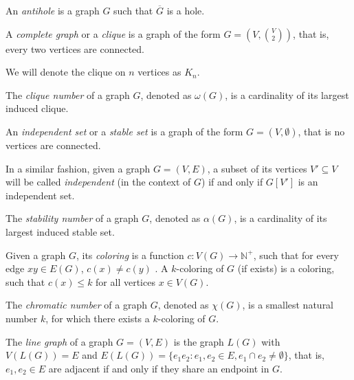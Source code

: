 \begin{defn}[antihole]
  An \emph{antihole} is a graph $G$ such that $\overline{G}$ is a hole.
\end{defn}

\begin{defn}[clique]
  A \emph{complete graph} or a \emph{clique} is a graph of the form $G = (V, {V \choose 2})$, that is, every two vertices are connected.
\end{defn}

We will denote the clique on $n$ vertices as $K_n$.

\begin{defn}
  The \emph{clique number} of a graph $G$, denoted as $\omega(G)$, is a cardinality of its largest induced clique.
\end{defn}

\begin{defn}
  An \emph{independent set} or a \emph{stable set} is a graph of the form $G = (V, \emptyset)$, that is no vertices are connected.
\end{defn}
In a similar fashion, given a graph $G = (V, E)$, a subset of its vertices $V' \subseteq V$ will be called \emph{independent} (in the context of $G$) if and only if $G[V']$ is an independent set.

\begin{defn}
  The \emph{stability number} of a graph $G$, denoted as $\alpha(G)$, is a cardinality of its largest induced stable set.
\end{defn}

\begin{defn}[coloring]
  Given a graph $G$, its \emph{coloring} is a function $c: V(G) \rightarrow \mathbb{N}^+$, such that for every edge $xy \in E(G)$, $c(x) \neq c(y)$ . A $k$-coloring of $G$ (if exists) is a coloring, such that $c(x) \leq k$ for all vertices $x \in V(G)$.
\end{defn}

\begin{defn}
  The \emph{chromatic number} of a graph $G$, denoted as $\chi(G)$, is a smallest natural number $k$, for which there exists a $k$-coloring of $G$.
\end{defn}

\begin{defn}
  The \emph{line graph} of a graph $G = (V, E)$ is the graph $L(G)$ with $V(L(G)) = E$ and $E(L(G)) = \{e_1 e_2: e_1, e_2 \in E, e_1 \cap e_2 \neq \emptyset\}$, that is, $e_1, e_2 \in E$ are adjacent if and only if they share an endpoint in $G$.
\end{defn}


